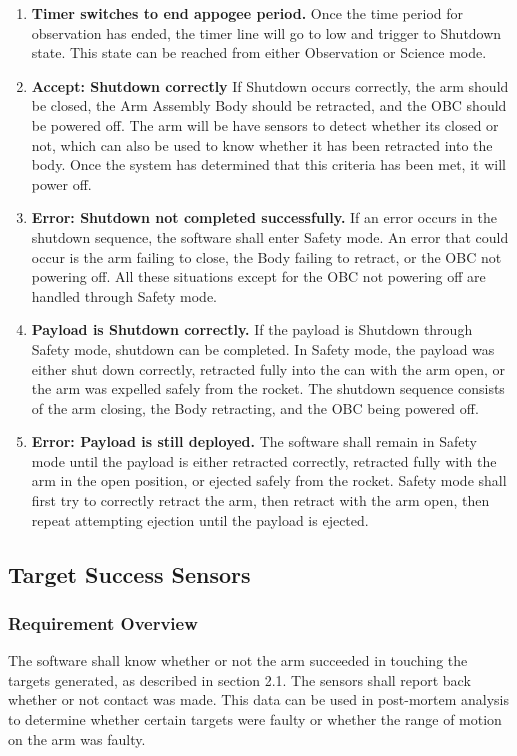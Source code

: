 \documentclass[letterpaper,10pt]{article}
\begin{document}
\begin{center}
\begin{enumerate}
{notified via an interrupt.}
\item{\textbf{Timer switches to end appogee period.} Once the time period for observation has ended, the timer line will go to low and trigger to Shutdown state. This state can be reached from either Observation or Science mode.}
\item{\textbf{Accept: Shutdown correctly} If Shutdown occurs correctly, the arm should be closed, the Arm Assembly Body should be retracted, and the \gls{OBC} should be powered off. The arm will be have sensors to detect whether its closed or not, which can also
be used to know whether it has been retracted into the body. Once the system has determined that this criteria has been met, it
will power off.}
\item{\textbf{Error: Shutdown not completed successfully.} If an error occurs in the shutdown sequence, the software shall enter Safety mode. An error that could occur is the arm failing to close, the Body failing to retract, or the \gls{OBC} not powering off. All 
these situations except for the \gls{OBC} not powering off are handled through Safety mode.}
\item{\textbf{Payload is Shutdown correctly.} If the payload is Shutdown through Safety mode, shutdown can be completed. In Safety mode, the payload was either shut down correctly, retracted fully into the can with the arm open, or the arm was expelled safely from the rocket. The shutdown sequence consists of the arm closing, the Body retracting, and the \gls{OBC} being powered off.}
\item{\textbf{Error: Payload is still deployed.} The software shall remain in Safety mode until the payload is either retracted correctly, retracted fully with the arm in the open position, or ejected safely from the rocket. Safety mode shall first try to correctly retract the arm, then retract with the arm open, then repeat attempting ejection until the payload is ejected.}
\end{enumerate}
\end{center}

\subsection{Target Success Sensors}
\subsubsection{Requirement Overview}
The software shall know whether or not the arm succeeded in touching the targets generated, as described in section 2.1. The sensors
shall report back whether or not contact was made. This data can be used in post-mortem analysis to determine whether
certain targets were faulty or whether the range of motion on the arm was faulty.
\end{document}
